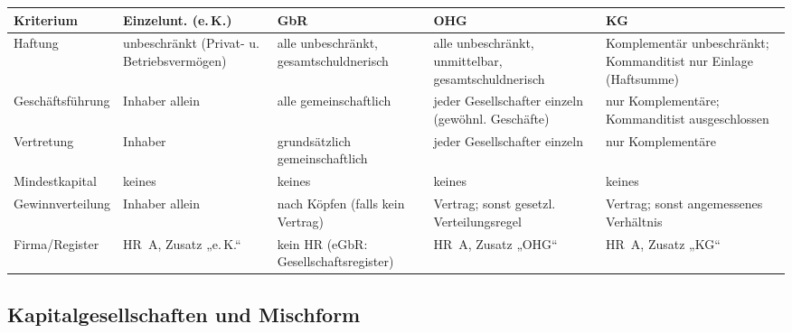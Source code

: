 \documentclass[11pt, a4paper]{article}
\begin{document}
\begin{center}
\small
\begin{tabular}{p{2.6cm} p{2.9cm} p{2.7cm} p{2.9cm} p{2.9cm}}
\toprule
\textbf{Kriterium} & \textbf{Einzelunt. (e.\,K.)} & \textbf{GbR} & \textbf{OHG} & \textbf{KG}\\
\midrule
Haftung & unbeschränkt (Privat- u. Betriebsvermögen) & alle unbeschränkt, gesamtschuldnerisch & alle unbeschränkt, unmittelbar, gesamtschuldnerisch & Komplementär unbeschränkt; Kommanditist nur Einlage (Haftsumme)\\
\addlinespace
Geschäftsführung & Inhaber allein & alle gemeinschaftlich & jeder Gesellschafter einzeln (gewöhnl. Geschäfte) & nur Komplementäre; Kommanditist ausgeschlossen\\
\addlinespace
Vertretung & Inhaber & grundsätzlich gemeinschaftlich & jeder Gesellschafter einzeln & nur Komplementäre\\
\addlinespace
Mindestkapital & keines & keines & keines & keines\\
\addlinespace
Gewinnverteilung & Inhaber allein & nach Köpfen (falls kein Vertrag) & Vertrag; sonst gesetzl. Verteilungsregel & Vertrag; sonst angemessenes Verhältnis\\
\addlinespace
Firma/Register & HR~A, Zusatz „e.\,K.`` & kein HR (eGbR: Gesellschaftsregister) & HR~A, Zusatz „OHG`` & HR~A, Zusatz „KG``\\
\bottomrule
\end{tabular}
\end{center}

\subsection{Kapitalgesellschaften und Mischform}
\end{document}
